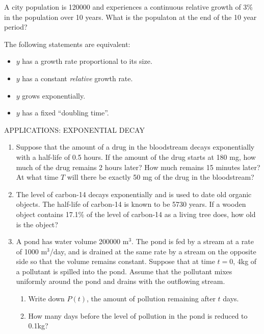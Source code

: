 \documentclass[11pt]{article}
\begin{document}
\vspace{1.in}
\pagebreak

A city population is 120000 and experiences a continuous relative growth of 3\% in the population over 10 years.  What is the populaton at the
end of the 10 year period?


\vspace{2.5in}

The following statements are equivalent:

\begin{itemize}
\item{$y$ has a growth rate proportional to its size.}
\item{$y$ has a constant \emph{relative} growth rate.}
\item{$y$ grows exponentially.}
  \item{$y$ has a fixed ``doubling time''.}
  \end{itemize}

\vspace{.1in}

APPLICATIONS: EXPONENTIAL DECAY\\


\begin{enumerate}
\item{Suppose that the amount of a drug in the bloodstream decays exponentially with a half-life of 0.5 hours.  If the amount of the drug starts 
at 180 mg, how much of the drug remains 2 hours later?  How much remains 15 minutes later?  At what time $T$ will there be exactly 50 mg of the drug
in the bloodstream?}
\vspace{2in}

\pagebreak

\item{The level of carbon-14 decays exponentially and is used to date old organic objects.  The half-life of carbon-14 is known to be 5730 years.  If a  wooden object 
  contains 17.1\% of the level of carbon-14 as a living tree does, how old is the object?}

  \vspace{2.5in}

\item{A pond has water volume 200000 m$^3$.  The pond is fed by a stream at a rate of 1000 m$^3$/day, and is drained at the same rate by a stream on the opposite side so that the volume remains constant.  Suppose that at time $t=0$, 4kg of a pollutant is spilled into the pond.  Assume that the pollutant mixes uniformly around the pond and drains with the outflowing stream.  }
  \begin{enumerate}

  \item{Write down $P(t)$, the amount of pollution remaining after $t$ days.  }
  \item{How many days before the level of pollution in the pond is reduced to 0.1kg?}
    \end{enumerate}


\end{enumerate}
\end{document}
